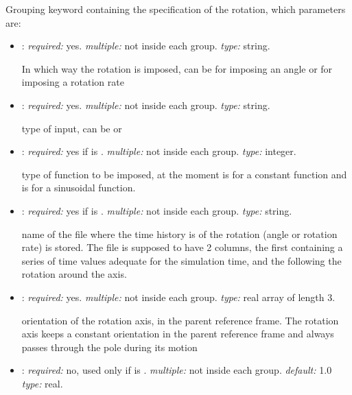 \begin{itemize}
Grouping keyword containing the specification of the rotation, which parameters are:

	\begin{itemize}
	\item {}: \textit{required:} yes. \textit{multiple:} not inside each  group. \textit{type:} string.
    
    In which way the rotation is imposed, can be  for imposing an angle  or  for imposing a rotation rate
    
    \item {}: \textit{required:} yes. \textit{multiple:} not inside each  group. \textit{type:} string.
    
    type of input, can be  or 
    
    \item {}: \textit{required:} yes if  is . \textit{multiple:} not inside each  group. \textit{type:} integer.
    
    type of function to be imposed, at the moment  is for a constant function and  is for a sinusoidal function.
    
        \item {}: \textit{required:} yes if  is . \textit{multiple:} not inside each  group. \textit{type:} string.
        
        name of the file where the time history is of the rotation (angle or rotation rate) is stored. The file is supposed to have 2 columns, the first containing a series of time values adequate for the simulation time, and the following the rotation around the axis. 
        
    \item {}: \textit{required:} yes. \textit{multiple:} not inside each  group. \textit{type:} real array of length 3.
    
    orientation of the rotation axis, in the parent reference frame. The rotation axis keeps a constant orientation in the parent reference frame and always passes through the pole during its motion
    
    \item {}: \textit{required:} no, used only if  is . \textit{multiple:} not inside each  group. \textit{default:} 1.0 \textit{type:} real.
    

\end{itemize}
\end{itemize}
